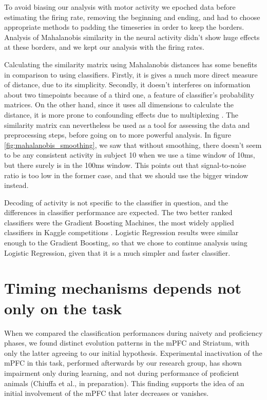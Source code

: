To avoid biasing our analysis with motor activity we epoched data before estimating the firing rate, removing the beginning and ending, and had to choose appropriate methods to padding the timeseries in order to keep the borders. Analysis of Mahalanobis similarity in the neural activity didn't show huge effects at these borders, and we kept our analysis with the firing rates. 

Calculating the similarity matrix using Mahalanobis distances has some benefits in comparison to using classifiers. Firstly, it is gives a much more direct measure of distance, due to its simplicity. Secondly, it doesn't interferes on information about two timepoints because of a third one, a feature of classifier's probability matrices. On the other hand, since it uses all dimensions to calculate the distance, it is more prone to confounding effects due to multiplexing \cite{gu2015oscillatory}. The similarity matrix can nevertheless be used as a tool for assessing the data and preprocessing steps, before going on to more powerful analysis. In figure \ref{fig:mahalanobis_smoothing}, we saw that without smoothing, there doesn't seem to be any consistent activity in subject 10 when we use a time window of 10ms, but there surely is in the 100ms window. This points out that signal-to-noise ratio is too low in the former case, and that we should use the bigger window instead. %

Decoding of activity is not specific to the classifier in question, and the differences in classifier performance are expected. The two better ranked classifiers were the Gradient Boosting Machines, the most widely applied classifiers in Kaggle competitions \cite{chen2016xgboost, ke2017lightgbm}. Logistic Regression results were similar enough to the Gradient Boosting, so that we chose to continue analysis using Logistic Regression, given that it is a much simpler and faster classifier.

\section{Timing mechanisms depends not only on the task}
When we compared the classification performances during naivety and proficiency phases, we found distinct evolution patterns in the mPFC and Striatum, with only the latter agreeing to our initial hypothesis. Experimental inactivation of the mPFC in this task, performed afterwards by our research group, has shown impairment only during learning, and not during performance of proficient animals (Chiuffa et al., in preparation). This finding supports the idea of an initial involvement of the mPFC that later decreases or vanishes. 

